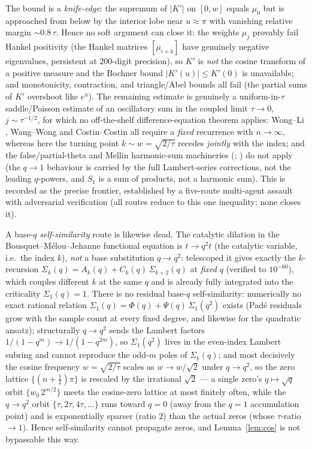 \begin{remark}\label{rem:knife}
The bound is a \emph{knife-edge}: the supremum of $|K'|$ on $[0,w]$ equals $\mu_0$ but is
approached from below by the interior lobe near $u\approx\pi$ with vanishing relative margin
$\sim 0.8\,\tau$. Hence no soft argument can close it: the weights $\mu_j$ provably fail
Hankel positivity (the Hankel matrices $[\mu_{i+k}]$ have genuinely negative eigenvalues,
persistent at $200$-digit precision), so $K'$ is \emph{not} the cosine transform of a
positive measure and the Bochner bound $|K'(u)|\le K'(0)$ is unavailable; and monotonicity,
contraction, and triangle/Abel bounds all fail (the partial sums of $K'$ overshoot like
$e^{u}$). The remaining estimate is genuinely a uniform-in-$\tau$ saddle/Poisson estimate of
an oscillatory sum in the coupled limit $\tau\to0$, $j\sim\tau^{-1/2}$, for which no
off-the-shelf difference-equation theorem applies: Wong--Li \cite{WongLi1992}, Wang--Wong
\cite{WangWong2003} and Costin--Costin \cite{CostinCostin1996} all require a \emph{fixed}
recurrence with $n\to\infty$, whereas here the turning point $k\sim w=\sqrt{2/\tau}$ recedes
\emph{jointly} with the index; and the false/partial-theta and Mellin harmonic-sum machineries
(\cite{BringmannMilas2015}; \cite{FGD1995}) do not apply (the $q\to1$ behaviour is carried by
the full Lambert-series corrections, not the leading $q$-powers, and $S_1$ is a sum of
products, not a harmonic sum). This is recorded as the precise frontier, established by a
five-route multi-agent assault with adversarial verification (all routes reduce to this one
inequality; none closes it).

A base-$q$ \emph{self-similarity} route is likewise dead. The catalytic dilation in the
Bousquet--M\'elou--Jehanne functional equation is $t\to q^2 t$ (the catalytic variable, i.e.\
the index $k$), \emph{not} a base substitution $q\to q^2$: telescoped it gives exactly the
$k$-recursion $\Sigma_k(q)=A_k(q)+C_k(q)\,\Sigma_{k+2}(q)$ at \emph{fixed} $q$ (verified to
$10^{-60}$), which couples different $k$ at the same $q$ and is already fully integrated into
the criticality $\Sigma_1(q)=1$. There is no residual base-$q$ self-similarity: numerically no
exact rational relation $\Sigma_1(q)=\Phi(q)+\Psi(q)\,\Sigma_1(q^2)$ exists (Pad\'e residuals
grow with the sample count at every fixed degree, and likewise for the quadratic ansatz);
structurally $q\to q^2$ sends the Lambert factors $1/(1-q^m)\to1/(1-q^{2m})$, so $\Sigma_1(q^2)$
lives in the even-index Lambert subring and cannot reproduce the odd-$m$ poles of $\Sigma_1(q)$;
and most decisively the cosine frequency $w=\sqrt{2/\tau}$ scales as $w\to w/\sqrt2$ under
$q\to q^2$, so the zero lattice $\{(n+\tfrac12)\pi\}$ is rescaled by the irrational $\sqrt2$ ---
a single zero's $q\mapsto\sqrt q$ orbit $\{w_0\,2^{m/2}\}$ meets the cosine-zero lattice at most
finitely often, while the $q\to q^2$ orbit $\{\tau,2\tau,4\tau,\dots\}$ runs toward $q=0$ (away
from the $q=1$ accumulation point) and is exponentially sparser (ratio $2$) than the actual
zeros (whose $\tau$-ratio $\to1$). Hence self-similarity cannot propagate zeros, and
Lemma~\ref{lem:cos} is not bypassable this way.
\end{remark}

